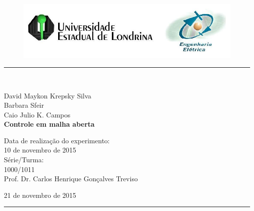 \begin{titlepage}
\begin{center}
\begin{figure}[h]
\includegraphics[scale=0.76]{img/topdotitulo.png}
\end{figure}
\rule{\columnwidth}{1.5mm}
\

\large David Maykon Krepsky Silva\\
Barbara Sfeir\\
Caio Julio K. Campos\\

\vspace{4cm}
{\bf \Large Controle em malha aberta}
\vspace{3.5cm}

\begin{flushright}
Data de realização do experimento:\\
10 de novembro de 2015\\
Série/Turma:\\
1000/1011\\
Prof. Dr. Carlos Henrique Gonçalves Treviso
\end{flushright}

\vspace{3.2cm}
21 de novembro de 2015

\rule{\columnwidth}{1.3mm}
\end{center}
\end{titlepage}